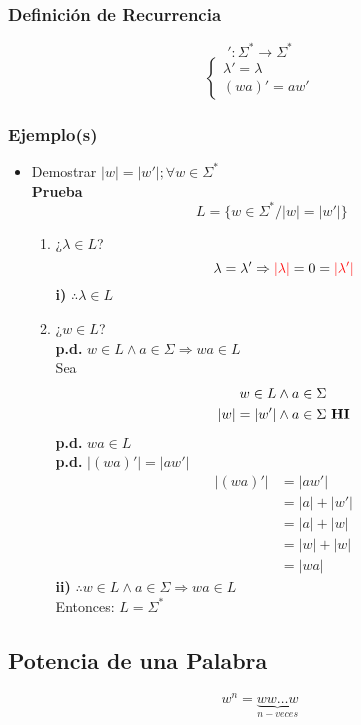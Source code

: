 \subsubsection*{Definición de Recurrencia}
$$':\Sigma^*\rightarrow\Sigma^*$$
$$
\begin{cases}
\lambda'=\lambda \\
(wa)' = aw'
\end{cases}
$$
\subsubsection{Ejemplo(s)}
\begin{itemize}
\item Demostrar $|w| = |w'| ; \forall w\in\Sigma^*$ \\
\textbf{Prueba}
$$ L = \{ w\in\Sigma^* / |w|=|w'| \} $$
\begin{enumerate}[label=\alph*)]
\item ¿$\lambda \in L$?
$$\lambda = \lambda' \Rightarrow {\color{red}|\lambda |} = 0 = {\color{red}| \lambda' |}$$
\textbf{i)} $\therefore \lambda\in L$
\item ¿$w \in L$? \\${ }$\\
\textbf{p.d.} $w\in L \wedge a\in\Sigma\Rightarrow wa\in L$\\
Sea 
\begin{align*}
w \in L & \wedge a\in\Sigma \\
|w| = |w'| & \wedge a\in\Sigma \text{ \textbf{HI}}
\end{align*}
\textbf{p.d.} $wa\in L$ \\
\textbf{p.d.} $|(wa)'|=|aw'|$
\begin{align*}
| (wa)' | & = | aw' | \\
	    & = |a| + |w'| \\
	    & = |a|+|w| \\
	    & = |w| + |w| \\
	    & = | wa|
\end{align*}
\textbf{ii)} $\therefore w\in L \wedge a \in\Sigma \Rightarrow wa\in L$ \\${ }$\\
Entonces: $L=\Sigma^*$
\end{enumerate}
\end{itemize}
\subsection{Potencia de una Palabra}
$$w^n =  \underbrace{ww\ldots w}_{n-veces}$$
